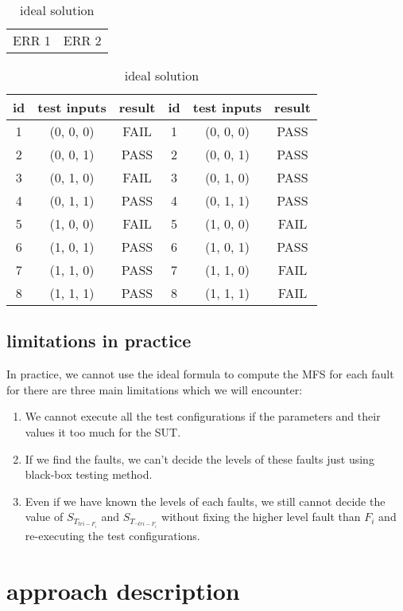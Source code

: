 \documentclass{sig-alternate}
\begin{document}
\begin{table}
\centering
\caption{ideal solution}
\label{ideal_solution}
\begin{tabular}{p{}|p{}} \hline
   ERR 1 & ERR 2
\end{tabular}

\begin{tabular}{c|c|c|c|c|c} \hline
id &test inputs & result & id&test inputs & result\\ \hline
1 &(0, 0, 0) &  FAIL &1&(0, 0, 0) &  PASS\\ \hline
2 &(0, 0, 1) &  PASS &2&(0, 0, 1) &  PASS\\ \hline
3 &(0, 1, 0) &  FAIL &3&(0, 1, 0) &  PASS\\ \hline
4 &(0, 1, 1) &  PASS &4&(0, 1, 1) &  PASS\\ \hline
5 &(1, 0, 0) &  FAIL &5&(1, 0, 0) &  FAIL\\ \hline
6 &(1, 0, 1) &  PASS &6&(1, 0, 1) &  PASS\\ \hline
7 &(1, 1, 0) &  PASS &7&(1, 1, 0) &  FAIL\\ \hline
8 &(1, 1, 1) &  PASS &8&(1, 1, 1) &  FAIL\\ \hline
\hline\end{tabular}
\end{table}


\subsection{limitations in practice}
In practice, we cannot use the ideal formula to compute the MFS for each fault for there are three main limitations which we will encounter:

\begin{enumerate}
 \item We cannot execute all the test configurations if the parameters and their values it too much for the SUT.
 
 \item If we find the faults, we can't decide the levels of these faults just using black-box testing method.
 
 \item Even if we have known the levels of each faults, we still cannot decide the value of $S_{T_{tri-F_{i}}}$ and  $S_{T_{\neg tri-F_{i}}}$ without fixing the higher level fault than $F_{i}$ and re-executing the test configurations.
\end{enumerate}


\section{approach description}
\end{document}
